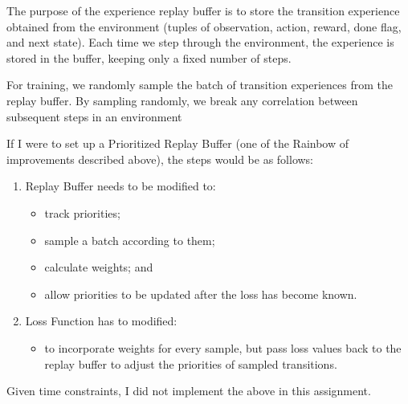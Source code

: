 \documentclass[11pt]{article}
\providecommand{\tightlist}{%
      \setlength{\itemsep}{0pt}\setlength{\parskip}{0pt}}
\begin{document}
The purpose of the experience replay buffer is to store the transition
experience obtained from the environment (tuples of observation, action,
reward, done flag, and next state). Each time we step through the
environment, the experience is stored in the buffer, keeping only a
fixed number of steps.

For training, we randomly sample the batch of transition experiences
from the replay buffer. By sampling randomly, we break any correlation
between subsequent steps in an environment

    If I were to set up a Prioritized Replay Buffer (one of the Rainbow of
improvements described above), the steps would be as follows:

\begin{enumerate}
\def\labelenumi{(\arabic{enumi})}
\tightlist
\item
  Replay Buffer needs to be modified to:

  \begin{itemize}
  \tightlist
  \item
    track priorities;
  \item
    sample a batch according to them;
  \item
    calculate weights; and
  \item
    allow priorities to be updated after the loss has become known.
  \end{itemize}
\item
  Loss Function has to modified:

  \begin{itemize}
  \tightlist
  \item
    to incorporate weights for every sample, but pass loss values back
    to the replay buffer to adjust the priorities of sampled
    transitions.
  \end{itemize}
\end{enumerate}

Given time constraints, I did not implement the above in this
assignment.
\end{document}
